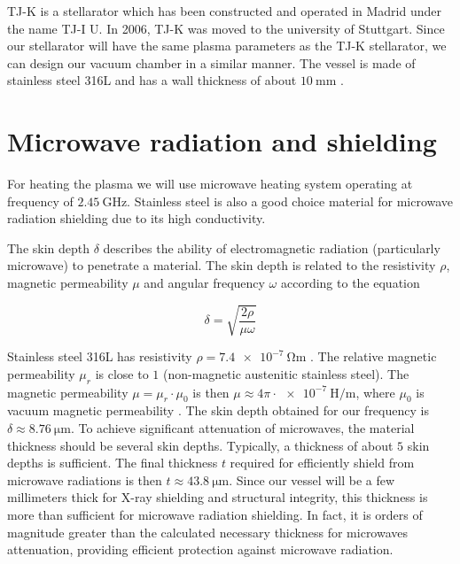 TJ-K is a stellarator which has been constructed and operated in Madrid under the name TJ-I U. In
2006, TJ-K was moved to the university of Stuttgart. Since our stellarator will have the same plasma parameters as the TJ-K stellarator, we can design our vacuum chamber in a similar manner.
The vessel is made of stainless steel 316L and has a wall thickness of about $\SI{10}{\milli\meter}$ \cite{TJK2}.



\section{Microwave radiation and shielding}

For heating the plasma we will use microwave heating system operating at frequency of $\SI{2.45}{\giga\hertz}$.
Stainless steel is also a good choice material for microwave radiation shielding due to its high conductivity.

The skin depth $\delta$ describes the ability of electromagnetic radiation (particularly microwave) to penetrate a material\cite{skin}.
The skin depth is related to the resistivity $\rho$, magnetic permeability $\mu$ and angular frequency $\omega$ according to the equation \cite{emrad}

\begin{equation}
      \delta =\sqrt{\frac{2 \rho}{\mu \omega}}
\end{equation}

Stainless steel 316L has resistivity  $\rho = \SI{7.4e-7}{\ohm\meter}$ \cite{cond}.
The relative magnetic permeability $\mu_r$ is close to $1$ (non-magnetic austenitic stainless steel).
The magnetic permeability $\mu = \mu_{r} \cdot \mu_0$ is then $\mu \approx 4 \pi \cdot \SI{e-7}{\henry\per\meter}$, where $\mu_0$ is vacuum magnetic permeability \cite{codata22}.
The skin depth obtained for our frequency is $\delta \approx \SI{8.76}{\micro\meter}$.
To achieve significant attenuation of microwaves, the material thickness should be several skin depths.
Typically, a thickness of about $5$ skin depths is sufficient.
The final thickness $t$ required for efficiently shield from microwave radiations is then $t \approx \SI{43.8}{\micro\meter}$.
Since our vessel will be a few millimeters thick for X-ray shielding and structural integrity, this thickness is more than sufficient for microwave radiation shielding.
In fact, it is orders of magnitude greater than the calculated necessary thickness for microwaves attenuation, providing efficient protection against microwave radiation.


